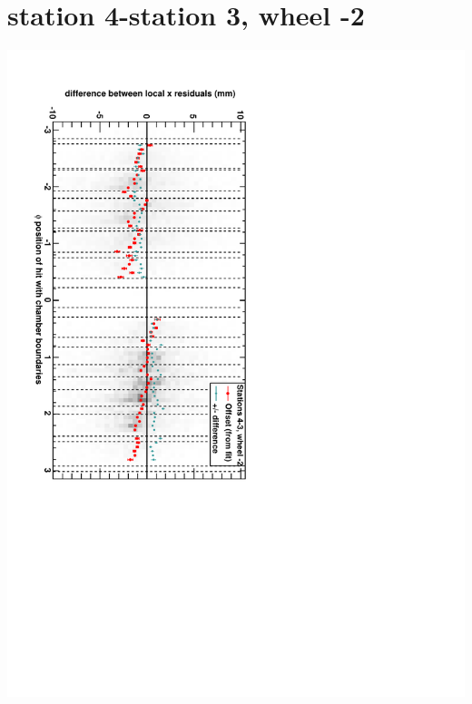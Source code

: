 \documentclass[compress]{beamer}
\begin{document}
\section*{station 4-station 3, wheel -2}
\begin{frame} \vfill \mbox{\hspace{-1 cm}\includegraphics[height=1.2\linewidth, angle=90]{DTrphidiff34VsPhi_whA_slope.pdf}} \end{frame}
\end{document}
